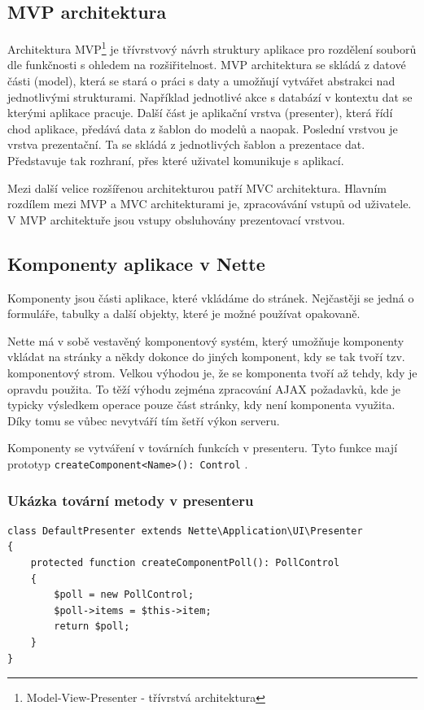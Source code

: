 \documentclass[czech,BP]{thesiskiv}
\begin{document}
		\subsection{MVP architektura}
		\par Architektura MVP\footnote{Model-View-Presenter - třívrstvá architektura} je třívrstvový návrh struktury aplikace pro rozdělení souborů dle funkčnosti s ohledem na rozšiřitelnost. MVP architektura se skládá z datové části (model), která se stará o práci s daty a umožňují vytvářet abstrakci nad jednotlivými strukturami. Například jednotlivé akce s databází v kontextu dat se kterými aplikace pracuje. Další část je aplikační vrstva (presenter), která řídí chod aplikace, předává data z šablon do modelů a naopak. Poslední vrstvou je vrstva prezentační. Ta se skládá z jednotlivých šablon a prezentace dat. Představuje tak rozhraní, přes které uživatel komunikuje s aplikací.
		\par Mezi další velice rozšířenou architekturou patří MVC architektura. Hlavním rozdílem mezi MVP a MVC architekturami je, zpracovávání vstupů od uživatele. V MVP architektuře jsou vstupy obsluhovány prezentovací vrstvou.
		\subsection{Komponenty aplikace v Nette}
		\par Komponenty jsou části aplikace, které vkládáme do stránek. Nejčastěji se jedná o formuláře, tabulky a další objekty, které je možné používat opakovaně.
		\par Nette má v sobě vestavěný komponentový systém, který umožňuje komponenty vkládat na stránky a někdy dokonce do jiných komponent, kdy se tak tvoří tzv. komponentový strom. Velkou výhodou je, že se komponenta tvoří až tehdy, kdy je opravdu použita. To těží výhodu zejména zpracování AJAX požadavků, kde je typicky výsledkem operace pouze část stránky, kdy není komponenta využita. Díky tomu se vůbec nevytváří tím šetří výkon serveru.
		\par Komponenty se vytváření v továrních funkcích v presenteru. Tyto funkce mají prototyp \texttt{createComponent<Name>(): Control} \cite{NetteComponents}.
		
		\subsubsection{Ukázka tovární metody v presenteru}
		\begin{lstlisting}[caption={Ukázka tovární metody v presenteru}]
class DefaultPresenter extends Nette\Application\UI\Presenter
{
	protected function createComponentPoll(): PollControl
	{
		$poll = new PollControl;
		$poll->items = $this->item;
		return $poll;
	}
}
\end{lstlisting}
		
\end{document}
